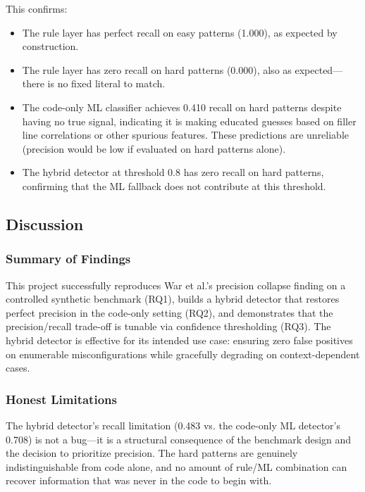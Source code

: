 This confirms:
\begin{itemize}
  \item The rule layer has perfect recall on easy patterns (1.000), as expected by construction.
  \item The rule layer has zero recall on hard patterns (0.000), also as expected—there is no fixed literal to match.
  \item The code-only ML classifier achieves 0.410 recall on hard patterns despite having no true signal, indicating it is making educated guesses based on filler line correlations or other spurious features. These predictions are unreliable (precision would be low if evaluated on hard patterns alone).
  \item The hybrid detector at threshold 0.8 has zero recall on hard patterns, confirming that the ML fallback does not contribute at this threshold.
\end{itemize}

\subsection{Discussion}
\label{sec:discussion}

\subsubsection{Summary of Findings}

This project successfully reproduces War et al.'s precision collapse finding on a controlled synthetic benchmark (RQ1), builds a hybrid detector that restores perfect precision in the code-only setting (RQ2), and demonstrates that the precision/recall trade-off is tunable via confidence thresholding (RQ3). The hybrid detector is effective for its intended use case: ensuring zero false positives on enumerable misconfigurations while gracefully degrading on context-dependent cases.

\subsubsection{Honest Limitations}

The hybrid detector's recall limitation (0.483 vs. the code-only ML detector's 0.708) is not a bug—it is a structural consequence of the benchmark design and the decision to prioritize precision. The hard patterns are genuinely indistinguishable from code alone, and no amount of rule/ML combination can recover information that was never in the code to begin with.

